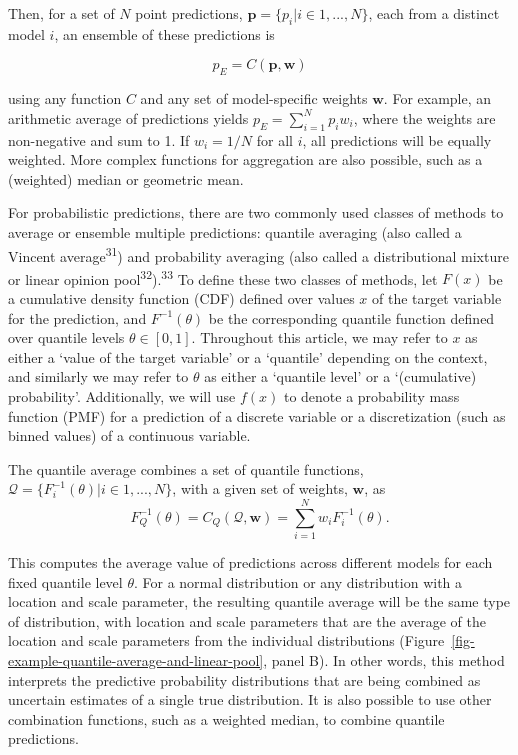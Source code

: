 \documentclass[
]{article}
\begin{document}
Then, for a set of \(N\) point predictions,
\(\pmb{p} = \{p_i|i \in 1, ..., N\}\), each from a distinct model \(i\),
an ensemble of these predictions is

\[
p_E = C(\pmb{p}, \pmb{w}) 
\]

using any function \(C\) and any set of model-specific weights
\(\pmb{w}\). For example, an arithmetic average of predictions yields
\(p_E = \sum_{i=1}^Np_iw_i\), where the weights are non-negative and sum
to 1. If \(w_i = 1/N\) for all \(i\), all predictions will be equally
weighted. More complex functions for aggregation are also possible, such
as a (weighted) median or geometric mean.

For probabilistic predictions, there are two commonly used classes of
methods to average or ensemble multiple predictions: quantile averaging
(also called a Vincent average\textsuperscript{31}) and probability
averaging (also called a distributional mixture or linear opinion
pool\textsuperscript{32}).\textsuperscript{33} To define these two
classes of methods, let \(F(x)\) be a cumulative density function (CDF)
defined over values \(x\) of the target variable for the prediction, and
\(F^{-1}(\theta)\) be the corresponding quantile function defined over
quantile levels \(\theta \in [0, 1]\). Throughout this article, we may
refer to \(x\) as either a `value of the target variable' or a
`quantile' depending on the context, and similarly we may refer to
\(\theta\) as either a `quantile level' or a `(cumulative) probability'.
Additionally, we will use \(f(x)\) to denote a probability mass function
(PMF) for a prediction of a discrete variable or a discretization (such
as binned values) of a continuous variable.

The quantile average combines a set of quantile functions,
\(\mathcal{Q} = \{F_i^{-1}(\theta)| i \in 1,...,N \}\), with a given set
of weights, \(\pmb{w}\), as \[
F^{-1}_Q(\theta) = C_Q(\mathcal{Q}, \pmb{w}) = \sum_{i = 1}^Nw_iF^{-1}_i(\theta).
\]

This computes the average value of predictions across different models
for each fixed quantile level \(\theta\). For a normal distribution or
any distribution with a location and scale parameter, the resulting
quantile average will be the same type of distribution, with location
and scale parameters that are the average of the location and scale
parameters from the individual distributions
(Figure~\ref{fig-example-quantile-average-and-linear-pool}, panel B). In
other words, this method interprets the predictive probability
distributions that are being combined as uncertain estimates of a single
true distribution. It is also possible to use other combination
functions, such as a weighted median, to combine quantile predictions.
\end{document}
